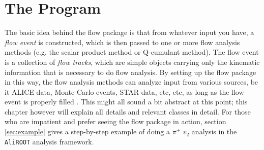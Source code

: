 \documentclass[a4paper]{book}
\numberwithin{equation}{subsection}
\begin{document}
\chapter{The Program}\label{sec:program}
The basic idea behind the flow package is that from whatever input you have, a \emph{flow event} is constructed, which is then passed to one or more flow analysis methods (e.g. the scalar product method or Q-cumulant method). The flow event is a collection of \emph{flow tracks}, which are simple objects carrying only the kinematic information that is necessary to do flow analysis. By setting up the flow package in this way, the flow analysis methods can analyze input from various sources, be it ALICE data, Monte Carlo events, STAR data, etc, etc, as long as the flow event is properly filled . This might all sound a bit abstract at this point; this chapter however will explain all details and relevant classes in detail. For those who are impatient and prefer seeing the flow package in action, section \ref{sec:example} gives a step-by-step example of doing a $\pi^{\pm}$ $v_2$ analysis in the \texttt{AliROOT} analysis framework. 
\end{document}
